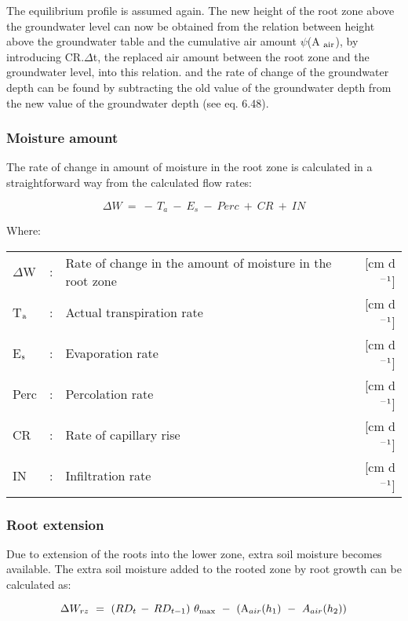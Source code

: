 The equilibrium profile is assumed again. The new height of the root zone above the
groundwater level can now be obtained from the relation between height above the
groundwater table and the cumulative air amount $\psi$(A $_{{\rm air}}$), by introducing CR.$\Delta$t, 
the replaced air amount between the root zone and the groundwater level, into this relation.
and the rate of change of the groundwater depth can be found by subtracting the old value
of the groundwater depth from the new value of the groundwater depth (see eq. 6.48). 

\subsubsection{Moisture amount}
The rate of change in amount of moisture in the root zone is calculated in a straightforward 
way from the calculated flow rates:

\begin{equation}
\Delta W ~=~ -\, T _{a} ~-~ E _{s} ~-~ Perc ~+~ CR ~+~ IN
\end{equation}

Where:\\[5pt]
\begin{tabularx}{\textwidth}{llXr}
$\Delta$W &:& Rate of change in the amount of moisture in the root zone  & [cm d$^{{\rm -1}}$]\\
T$_{{\rm a}}$ &:& Actual transpiration rate  & [cm d$^{{\rm -1}}$]\\
E$_{{\rm s}}$ &:& Evaporation rate  & [cm d$^{{\rm -1}}$]\\
Perc &:& Percolation rate  & [cm d$^{{\rm -1}}$]\\
CR &:& Rate of capillary rise  & [cm d$^{{\rm -1}}$]\\
IN &:& Infiltration rate  & [cm d$^{{\rm -1}}$]\\
\end{tabularx}

\subsubsection{Root extension}
Due to extension of the roots into the lower zone, extra soil moisture becomes available.
The extra soil moisture added to the rooted zone by root growth can be calculated as:

\begin{equation}
\Delta W_{rz} ~=~(RD _{t} \, -\, RD _{t-1} )~\theta _{\max } ~-~({\rm A} _{air} (h _{1} )~-~A _{air} (h _{2} ))  
\end{equation}

